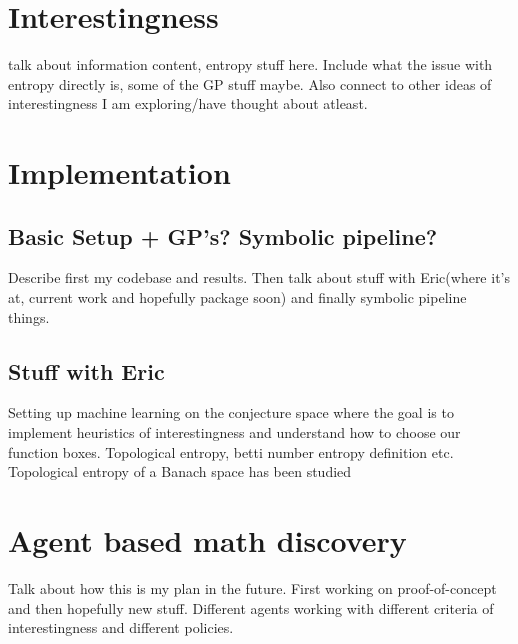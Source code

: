 \section{Interestingness}
talk about information content, entropy stuff here. Include what the issue with entropy directly is, some of the GP stuff maybe. Also connect to other ideas of interestingness I am exploring/have thought about atleast.

\section{Implementation}
\subsection{Basic Setup + GP's? Symbolic pipeline?}
Describe first my codebase and results. Then talk about stuff with Eric(where it's at, current work and hopefully package soon) and finally symbolic pipeline things.
\subsection{Stuff with Eric}
Setting up machine learning on the conjecture space where the goal is to implement heuristics of interestingness and understand how to choose our function boxes.
Topological entropy, betti number entropy definition etc. Topological entropy of a Banach space has been studied \cite{bobokTopologicalEntropyBanach2011}

\section{Agent based math discovery}
Talk about how this is my plan in the future. First working on proof-of-concept and then hopefully new stuff.
Different agents working with different criteria of interestingness and different policies.
